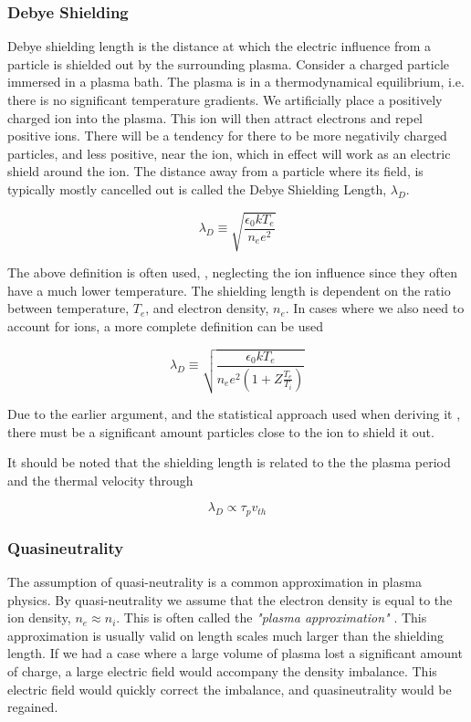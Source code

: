 		\subsubsection{Debye Shielding}
		Debye shielding length is the distance at which the electric influence
		from a particle is shielded out by the surrounding plasma.
		Consider a charged particle immersed in a plasma bath. The plasma is in
		a thermodynamical equilibrium, i.e. there is no significant temperature
		gradients. We artificially place a positively charged ion into the plasma.
		This ion will then attract electrons and repel positive ions. There will be a tendency
		for there to be more negativily charged particles, and less positive, near the
		ion, which in effect will work as an electric shield around the ion. The
		distance away from a particle where its field, is typically mostly cancelled
		out is called the Debye Shielding Length, \(\lambda_D\).

		\begin{equation}
			\lambda_D \equiv \sqrt{\frac{\epsilon_0 kT_e}{n_e e^2}}
		\end{equation}

		The above definition is often used, \citep{pecseli_waves_2012},
		neglecting the ion influence since they often have a much lower temperature.
		The shielding length is dependent on the ratio between temperature, \(T_e\),
		and electron density, \(n_e\).
		In cases where we also need to account for ions, a more complete definition can be used

		\begin{equation}
			\lambda_D \equiv \sqrt{\frac{\epsilon_0 k T_e}{n_e e^2(1+Z \frac{T_e}{T_i})}}
		\end{equation}

		Due to the earlier argument, and the statistical approach used when deriving it \citep{goldston_introduction_1995},
		there must be a significant amount particles close to the ion to shield it out.

		It should be noted that the shielding length is related \citep{fitzpatrick_plasma_2014} to the
		the plasma period and the thermal velocity through

		\begin{equation}
			\lambda_D \propto \tau_p v_{th}
		\end{equation}


		\subsubsection{Quasineutrality}
		The assumption of quasi-neutrality is a common approximation in plasma
		physics. By quasi-neutrality we assume that the electron
		density is equal to the ion density, \(n_e \approx n_i\). This is often called the
		\textit{"plasma approximation"} \citep{chen_introduction_1984}.
		This approximation is usually valid on length scales much larger than the shielding
		length. If we had a case where a large volume of plasma lost a significant
		amount of charge, a large electric field would accompany the density imbalance.
		This electric field would quickly correct the imbalance, and quasineutrality
		would be regained.

